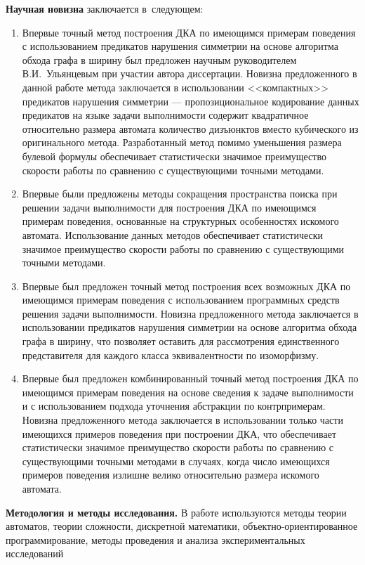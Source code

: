 \textbf{Научная новизна} заключается в~следующем:
\begin{enumerate}
  \item Впервые точный метод построения ДКА по имеющимся примерам поведения с использованием предикатов нарушения симметрии на основе алгоритма обхода графа в ширину был предложен научным руководителем В.И.~Ульянцевым при участии автора диссертации.
  Новизна предложенного в данной работе метода заключается в использовании <<компактных>> предикатов нарушения симметрии --- пропозициональное кодирование данных предикатов на языке задачи выполнимости содержит квадратичное относительно размера автомата количество дизъюнктов вместо кубического из оригинального метода.
  Разработанный метод помимо уменьшения размера булевой формулы обеспечивает статистически значимое преимущество скорости работы по сравнению с существующими точными методами.
  \item Впервые были предложены методы сокращения пространства поиска при решении задачи выполнимости для построения ДКА по имеющимся примерам поведения, основанные на структурных особенностях искомого автомата.
  Использование данных методов обеспечивает статистически значимое преимущество скорости работы по сравнению с существующими точными методами. 
  \item Впервые был предложен точный метод построения всех возможных ДКА по имеющимся примерам поведения с использованием программных средств решения задачи выполнимости.
  Новизна предложенного метода заключается в использовании предикатов нарушения симметрии на основе алгоритма обхода графа в ширину, что позволяет оставить для рассмотрения единственного представителя для каждого класса эквивалентности по изоморфизму.
  \item Впервые был предложен комбинированный точный метод построения ДКА по имеющимся примерам поведения на основе сведения к задаче выполнимости и с использованием подхода уточнения абстракции по контрпримерам.
  Новизна предложенного метода заключается в использовании только части имеющихся примеров поведения при построении ДКА, что обеспечивает статистически значимое преимущество скорости работы по сравнению с существующими точными методами в случаях, когда число имеющихся примеров поведения излишне велико относительно размера искомого автомата.
\end{enumerate}

\textbf{Методология и методы исследования.} В работе используются методы теории автоматов, теории сложности, дискретной математики, объектно-ориентированное программирование, методы проведения и анализа экспериментальных исследований


